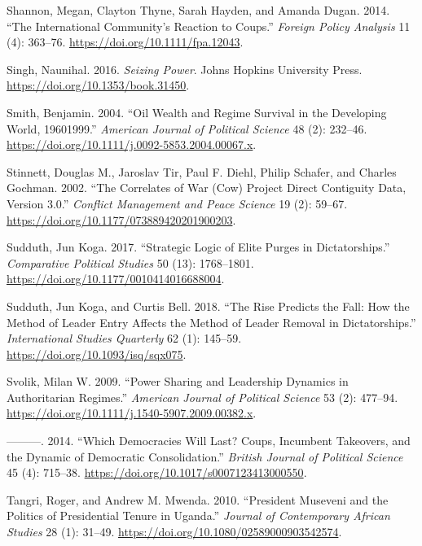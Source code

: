 \documentclass[
  12pt,
]{report}
\newlength{\cslhangindent}
\newenvironment{CSLReferences}[2] %
 {\begin{list}{}{%
  \setlength{\itemindent}{0pt}
  \setlength{\leftmargin}{0pt}
  \setlength{\parsep}{0pt}
  \ifodd #1
   \setlength{\leftmargin}{\cslhangindent}
   \setlength{\itemindent}{-1\cslhangindent}
  \fi
  \setlength{\itemsep}{#2\baselineskip}}}
 {\end{list}}
\begin{document}
\begin{CSLReferences}{1}{0}
Shannon, Megan, Clayton Thyne, Sarah Hayden, and Amanda Dugan. 2014.
{``The International Community's Reaction to Coups.''} \emph{Foreign
Policy Analysis} 11 (4): 363--76.
\url{https://doi.org/10.1111/fpa.12043}.

Singh, Naunihal. 2016. \emph{Seizing Power}. Johns Hopkins University
Press. \url{https://doi.org/10.1353/book.31450}.

Smith, Benjamin. 2004. {``Oil Wealth and Regime Survival in the
Developing World, 1960{\textendash}1999.''} \emph{American Journal of
Political Science} 48 (2): 232--46.
\url{https://doi.org/10.1111/j.0092-5853.2004.00067.x}.

Stinnett, Douglas M., Jaroslav Tir, Paul F. Diehl, Philip Schafer, and
Charles Gochman. 2002. {``The Correlates of War (Cow) Project Direct
Contiguity Data, Version 3.0.''} \emph{Conflict Management and Peace
Science} 19 (2): 59--67.
\url{https://doi.org/10.1177/073889420201900203}.

Sudduth, Jun Koga. 2017. {``Strategic Logic of Elite Purges in
Dictatorships.''} \emph{Comparative Political Studies} 50 (13):
1768--1801. \url{https://doi.org/10.1177/0010414016688004}.

Sudduth, Jun Koga, and Curtis Bell. 2018. {``The Rise Predicts the Fall:
How the Method of Leader Entry Affects the Method of Leader Removal in
Dictatorships.''} \emph{International Studies Quarterly} 62 (1):
145--59. \url{https://doi.org/10.1093/isq/sqx075}.

Svolik, Milan W. 2009. {``Power Sharing and Leadership Dynamics in
Authoritarian Regimes.''} \emph{American Journal of Political Science}
53 (2): 477--94. \url{https://doi.org/10.1111/j.1540-5907.2009.00382.x}.

---------. 2014. {``Which Democracies Will Last? Coups, Incumbent
Takeovers, and the Dynamic of Democratic Consolidation.''} \emph{British
Journal of Political Science} 45 (4): 715--38.
\url{https://doi.org/10.1017/s0007123413000550}.

Tangri, Roger, and Andrew M. Mwenda. 2010. {``President Museveni and the
Politics of Presidential Tenure in Uganda.''} \emph{Journal of
Contemporary African Studies} 28 (1): 31--49.
\url{https://doi.org/10.1080/02589000903542574}.


\end{CSLReferences}
\end{document}
